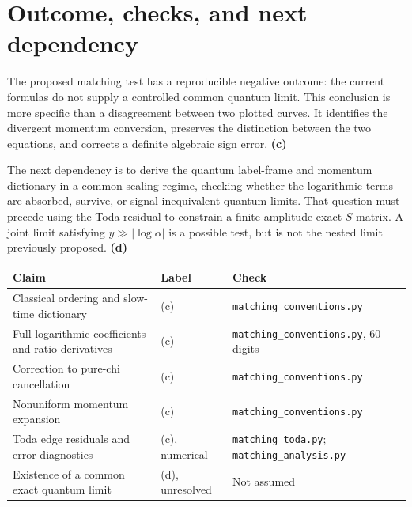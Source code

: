 \documentclass[11pt,a4paper]{article}
\newcommand{\Lc}{\textsf{\textbf{(c)}}}
\newcommand{\Ld}{\textsf{\textbf{(d)}}}
\newcommand{\scr}[1]{\texttt{matching\_#1.py}}
\begin{document}
\section{Outcome, checks, and next dependency}
The proposed matching test has a reproducible negative outcome: the current
formulas do not supply a controlled common quantum limit. This conclusion is
more specific than a disagreement between two plotted curves. It identifies
the divergent momentum conversion, preserves the distinction between the two
equations, and corrects a definite algebraic sign error. \Lc

The next dependency is to derive the quantum label-frame and momentum
dictionary in a common scaling regime, checking whether the logarithmic terms
are absorbed, survive, or signal inequivalent quantum limits. That question
must precede using the Toda residual to constrain a finite-amplitude exact
$S$-matrix. A joint limit satisfying $y\gg|\log\alpha|$ is a possible test,
but is not the nested limit previously proposed. \Ld

\begin{center}\small
\begin{tabular}{@{}L{6.3cm}L{2cm}L{4.7cm}@{}}\toprule
Claim & Label & Check\\\midrule
Classical ordering and slow-time dictionary & (c) & \scr{conventions}\\
Full logarithmic coefficients and ratio derivatives & (c) & \scr{conventions}, 60 digits\\
Correction to pure-chi cancellation & (c) & \scr{conventions}\\
Nonuniform momentum expansion & (c) & \scr{conventions}\\
Toda edge residuals and error diagnostics & (c), numerical & \scr{toda}; \scr{analysis}\\
Existence of a common exact quantum limit & (d), unresolved & Not assumed\\\bottomrule
\end{tabular}
\end{center}
\end{document}
